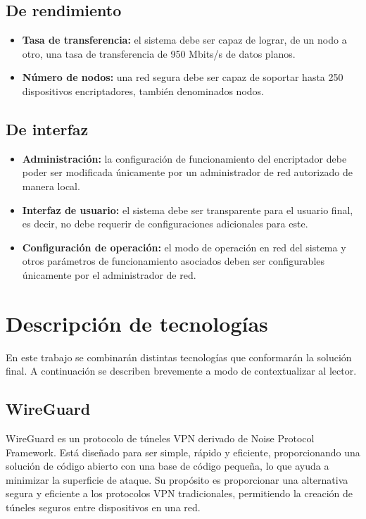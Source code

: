 \subsection{De rendimiento}

\begin{itemize}
    \item \textbf{Tasa de transferencia:} el sistema debe ser capaz de lograr, de un nodo a otro, una tasa de transferencia de 950 Mbits/s de datos planos.
    \item \textbf{Número de nodos:} una red segura debe ser capaz de soportar hasta 250 dispositivos encriptadores, también denominados nodos. 
\end{itemize}

\subsection{De interfaz}

\begin{itemize}
    \item \textbf{Administración:} la configuración de funcionamiento del  encriptador debe poder ser modificada únicamente por un administrador de red autorizado de manera local.
    \item \textbf{Interfaz de usuario:} el sistema debe ser transparente para el usuario final, es decir, no debe requerir de configuraciones adicionales para este.
    \item \textbf{Configuración de operación:} el modo de operación en red del sistema y otros parámetros de funcionamiento asociados deben ser configurables únicamente por el administrador de red.
\end{itemize}
\clearpage

\section{Descripción de tecnologías}
En este trabajo se combinarán distintas tecnologías que conformarán la solución final. A continuación se describen brevemente a modo de contextualizar al lector.

\subsection{WireGuard}
WireGuard es un protocolo de túneles VPN derivado de Noise Protocol Framework. Está diseñado para ser simple, rápido y eficiente, proporcionando una solución de código abierto con una base de código pequeña, lo que ayuda a minimizar la superficie de ataque. Su propósito es proporcionar una alternativa segura y eficiente a los protocolos VPN tradicionales, permitiendo la creación de túneles seguros entre dispositivos en una red. 

